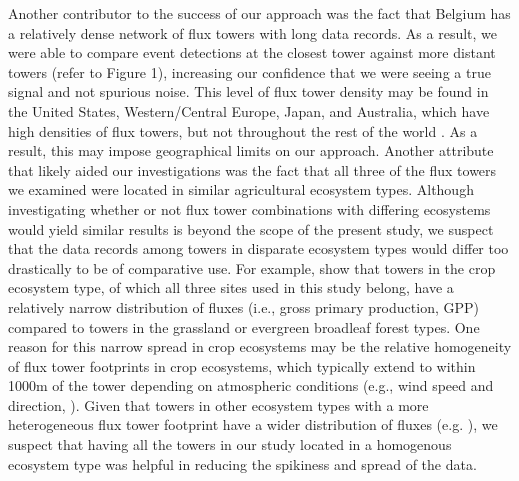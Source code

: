 \documentclass{article}
\begin{document}
Another contributor to the success of our approach was the fact that Belgium has a relatively dense network of flux towers with long data records. As a result, we were able to compare event detections at the closest tower against more distant towers (refer to Figure 1), increasing our confidence that we were seeing a true signal and not spurious noise. This level of flux tower density may be found in the United States, Western/Central Europe, Japan, and Australia, which have high densities of flux towers, but not throughout the rest of the world \citep{baldocchi2001fluxnet,pastorello2020fluxnet2015}. As a result, this may impose geographical limits on our approach. Another attribute that likely aided our investigations was the fact that all three of the flux towers we examined were located in similar agricultural ecosystem types. Although investigating whether or not flux tower combinations with differing ecosystems would yield similar results is beyond the scope of the present study, we suspect that the data records among towers in disparate ecosystem types would differ too drastically to be of comparative use. For example, \citet{pastorello2020fluxnet2015} show that towers in the crop ecosystem type, of which all three sites used in this study belong, have a relatively narrow distribution of fluxes (i.e., gross primary production, GPP) compared to towers in the grassland or evergreen broadleaf forest types. One reason for this narrow spread in crop ecosystems may be the relative homogeneity of flux tower footprints in crop ecosystems, which typically extend to within 1000m of the tower depending on atmospheric conditions (e.g., wind speed and direction, \citep{chuRepresentativenessEddyCovarianceFlux2021}). Given that towers in other ecosystem types with a more heterogeneous flux tower footprint have a wider distribution of fluxes (e.g. \citep{pastorello2020fluxnet2015}), we suspect that having all the towers in our study located in a homogenous ecosystem type was helpful in reducing the spikiness and spread of the data. 
\end{document}
